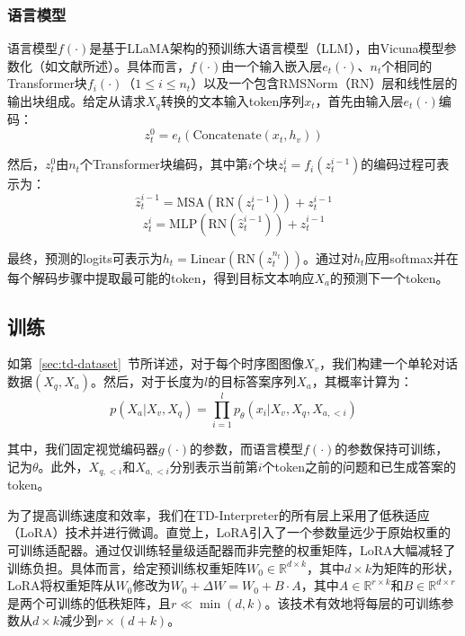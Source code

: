 \subsubsection{语言模型}

语言模型$f(\cdot)$是基于LLaMA架构的预训练大语言模型（LLM），由Vicuna模型参数化（如文献所述）。具体而言，$f(\cdot)$由一个输入嵌入层$e_t(\cdot)$、$n_t$个相同的Transformer块$f_i(\cdot)$（$1 \le i \le n_t$）以及一个包含RMSNorm（RN）层和线性层的输出块组成。给定从请求$X_q$转换的文本输入token序列$x_t$，首先由输入层$e_t(\cdot)$编码：
\begin{equation}
  z_t^0 = e_t(\text{Concatenate}(x_t, h_v))
\end{equation}

然后，$z_t^0$由$n_t$个Transformer块编码，其中第$i$个块$z_t^i = f_i(z_t^{i-1})$的编码过程可表示为：
\begin{equation}
  \hat{z}_t^{i-1} = \text{MSA}(\text{RN}(z_t^{i-1})) + z_t^{i-1}
\end{equation}
\begin{equation}
  z_t^i = \text{MLP}(\text{RN}(\hat{z}_t^{i-1})) + \hat{z}_t^{i-1}
\end{equation}

最终，预测的logits可表示为$h_t = \text{Linear}(\text{RN}(z_t^{n_t}))$。通过对$h_t$应用softmax并在每个解码步骤中提取最可能的token，得到目标文本响应$X_a$的预测下一个token。

\subsection{训练}

如第~\ref{sec:td-dataset}~节所详述，对于每个时序图图像$X_v$，我们构建一个单轮对话数据$(X_q, X_a)$。然后，对于长度为$l$的目标答案序列$X_a$，其概率计算为：
\begin{equation}
  p(X_a | X_v, X_q) = \prod_{i=1}^{l} p_\theta(x_i | X_v, X_q, X_{a,<i})
\end{equation}

其中，我们固定视觉编码器$g(\cdot)$的参数，而语言模型$f(\cdot)$的参数保持可训练，记为$\theta$。此外，$X_{q,<i}$和$X_{a,<i}$分别表示当前第$i$个token之前的问题和已生成答案的token。

为了提高训练速度和效率，我们在TD-Interpreter的所有层上采用了低秩适应（LoRA）技术并进行微调。直觉上，LoRA引入了一个参数量远少于原始权重的可训练适配器。通过仅训练轻量级适配器而非完整的权重矩阵，LoRA大幅减轻了训练负担。具体而言，给定预训练权重矩阵$W_0 \in \mathbb{R}^{d \times k}$，其中$d \times k$为矩阵的形状，LoRA将权重矩阵从$W_0$修改为$W_0 + \Delta W = W_0 + B \cdot A$，其中$A \in \mathbb{R}^{r \times k}$和$B \in \mathbb{R}^{d \times r}$是两个可训练的低秩矩阵，且$r \ll \min(d, k)$。该技术有效地将每层的可训练参数从$d \times k$减少到$r \times (d + k)$。



